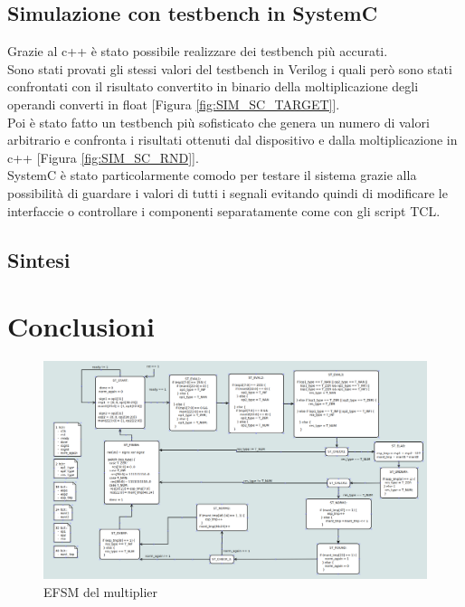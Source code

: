 \documentclass[]{IEEEtran}
\begin{document}
\subsection{Simulazione con testbench in SystemC}
Grazie al c++ è stato possibile realizzare dei testbench più accurati. 
\\Sono stati provati gli stessi valori del testbench in Verilog i quali però sono stati confrontati con il risultato convertito in binario della moltiplicazione degli operandi converti in float [Figura \ref{fig:SIM_SC_TARGET}].
\\Poi è stato fatto un testbench più sofisticato che genera un numero di valori arbitrario e confronta i risultati ottenuti dal dispositivo e dalla moltiplicazione in c++ [Figura \ref{fig:SIM_SC_RND}].
\\SystemC è stato particolarmente comodo per testare il sistema grazie alla possibilità di guardare i valori di tutti i segnali evitando quindi di modificare le interfaccie o controllare i componenti separatamente come con gli script TCL.


\subsection{Sintesi}











\section{Conclusioni}




\appendix

\begin{figure}[bt]
    \centering
    \includegraphics[width=\textwidth]{figures/EFSM_mult}
    \caption{EFSM del multiplier}
    \label{fig:EFSM_MULT}
\end{figure}
\end{document}
